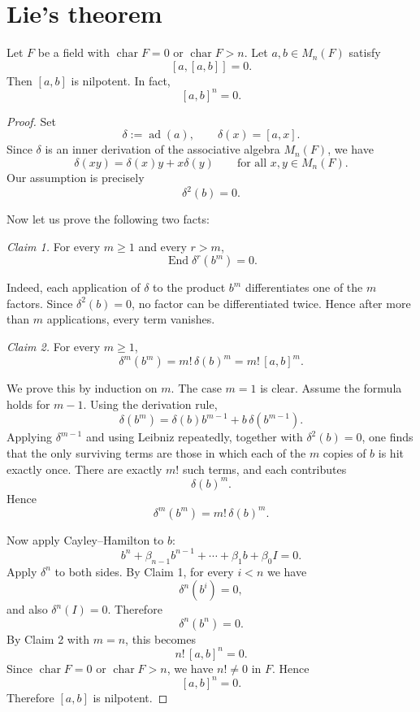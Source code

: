 \section{Lie's theorem}

\begin{lemma}
    Let $F$ be a field with $\operatorname{char} F=0$ or $\operatorname{char} F>n$.
    Let $a,b\in M_n(F)$ satisfy
    \[
        [a,[a,b]]=0.
    \]
    Then $[a,b]$ is nilpotent. In fact,
    \[
        [a,b]^n=0.
    \]
\end{lemma}

\begin{proof}
    Set
    \[
        \delta:=\operatorname{ad}(a),\qquad \delta(x)=[a,x].
    \]
    Since $\delta$ is an inner derivation of the associative algebra $M_n(F)$, we have
    \[
        \delta(xy)=\delta(x)y+x\delta(y)
        \qquad\text{for all }x,y\in M_n(F).
    \]
    Our assumption is precisely
    \[
        \delta^2(b)=0.
    \]

    Now let us prove the following two facts:

    \medskip
    \noindent
    \textit{Claim 1.} For every $m\ge 1$ and every $r>m$,
    \[\operatorname{End}
        \delta^r(b^m)=0.
    \]

    \noindent
    Indeed, each application of $\delta$ to the product $b^m$ differentiates one of the $m$
    factors. Since $\delta^2(b)=0$, no factor can be differentiated twice. Hence after more
    than $m$ applications, every term vanishes.

    \medskip
    \noindent
    \textit{Claim 2.} For every $m\ge 1$,
    \[
        \delta^m(b^m)=m!\,\delta(b)^m=m!\,[a,b]^m.
    \]

    \noindent
    We prove this by induction on $m$. The case $m=1$ is clear. Assume the formula holds
    for $m-1$. Using the derivation rule,
    \[
        \delta(b^m)=\delta(b)b^{m-1}+b\,\delta(b^{m-1}).
    \]
    Applying $\delta^{m-1}$ and using Leibniz repeatedly, together with $\delta^2(b)=0$,
    one finds that the only surviving terms are those in which each of the $m$ copies of $b$
    is hit exactly once. There are exactly $m!$ such terms, and each contributes
    \[
        \delta(b)^m.
    \]
    Hence
    \[
        \delta^m(b^m)=m!\,\delta(b)^m.
    \]

    \medskip
    Now apply Cayley--Hamilton to $b$:
    \[
        b^n+\beta_{n-1}b^{n-1}+\cdots+\beta_1 b+\beta_0 I=0.
    \]
    Apply $\delta^n$ to both sides. By Claim 1, for every $i<n$ we have
    \[
        \delta^n(b^i)=0,
    \]
    and also $\delta^n(I)=0$. Therefore
    \[
        \delta^n(b^n)=0.
    \]
    By Claim 2 with $m=n$, this becomes
    \[
        n!\,[a,b]^n=0.
    \]
    Since $\operatorname{char} F=0$ or $\operatorname{char} F>n$, we have $n!\neq 0$ in $F$.
    Hence
    \[
        [a,b]^n=0.
    \]
    Therefore $[a,b]$ is nilpotent.
\end{proof}

